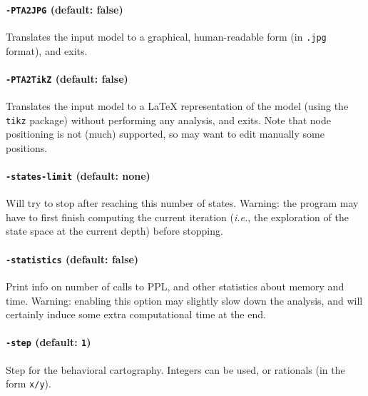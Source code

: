 \documentclass[a4paper,11pt]{report}
\newcommand{\styleOption}[1]{\textcolor{optioncolor}{\texttt{#1}}}
\newcommand{\ie}{\textcolor{colorok}{\textit{i.e.}, }}
\begin{document}
\paragraph{\styleOption{-PTA2JPG} (default: false)}
Translates the input model to a graphical, human-readable form (in \texttt{.jpg} format), and exits.

\paragraph{\styleOption{-PTA2TikZ} (default: false)}
Translates the input model to a \LaTeX{} representation of the model (using the \texttt{tikz} package) without performing any analysis, and exits.
Note that node positioning is not (much) supported, so may want to edit manually some positions.

\paragraph{\styleOption{-states-limit} (default: none)}
Will try to stop after reaching this number of states.
Warning: the program may have to first finish computing the current iteration (\ie{} the exploration of the state space at the current depth) before stopping.


\paragraph{\styleOption{-statistics} (default: false)}
Print info on number of calls to PPL, and other statistics about memory and time.
Warning: enabling this option may slightly slow down the analysis, and will certainly induce some extra computational time at the end.



\paragraph{\styleOption{-step} (default: \styleOption{1})}
Step for the behavioral cartography.
Integers can be used, or rationals (in the form \styleOption{x/y}).
\end{document}
